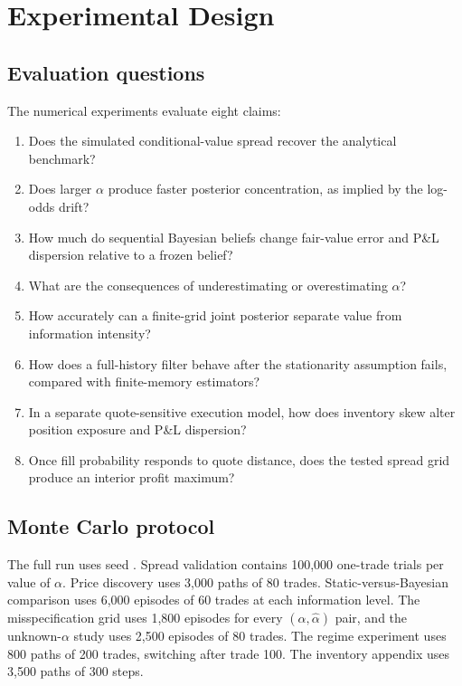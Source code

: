\documentclass[11pt]{article}
\begin{document}
\section{Experimental Design}

\subsection{Evaluation questions}

The numerical experiments evaluate eight claims:
\begin{enumerate}[label=Q\arabic*.]
\item Does the simulated conditional-value spread recover the analytical benchmark?
\item Does larger $\alpha$ produce faster posterior concentration, as implied by the log-odds drift?
\item How much do sequential Bayesian beliefs change fair-value error and P\&L dispersion relative to a frozen belief?
\item What are the consequences of underestimating or overestimating $\alpha$?
\item How accurately can a finite-grid joint posterior separate value from information intensity?
\item How does a full-history filter behave after the stationarity assumption fails, compared with finite-memory estimators?
\item In a separate quote-sensitive execution model, how does inventory skew alter position exposure and P\&L dispersion?
\item Once fill probability responds to quote distance, does the tested spread grid produce an interior profit maximum?
\end{enumerate}

\subsection{Monte Carlo protocol}

The full run uses seed \ResultsSeed. Spread validation contains 100,000 one-trade trials per value of $\alpha$. Price discovery uses 3,000 paths of 80 trades. Static-versus-Bayesian comparison uses 6,000 episodes of 60 trades at each information level. The misspecification grid uses 1,800 episodes for every $(\alpha,\widehat{\alpha})$ pair, and the unknown-$\alpha$ study uses 2,500 episodes of 80 trades. The regime experiment uses 800 paths of 200 trades, switching after trade 100. The inventory appendix uses 3,500 paths of 300 steps.
\end{document}
